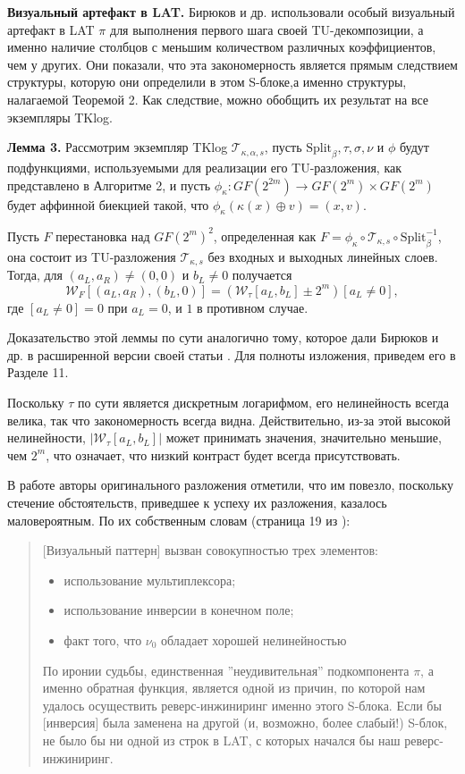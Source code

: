 \textbf{Визуальный артефакт в LAT.} Бирюков и др. использовали особый визуальный артефакт в LAT \(\pi\) для выполнения первого шага своей TU-декомпозиции, а именно наличие столбцов с меньшим количеством различных коэффициентов, чем у других. Они показали, что эта закономерность является прямым следствием структуры, которую они определили в этом S-блоке,а именно структуры, налагаемой Теоремой 2. Как следствие, можно обобщить их результат на все экземпляры TKlog.

\textbf{Лемма 3.}
Рассмотрим экземпляр TKlog \(\mathscr{T}_{\kappa,\alpha,s}\), пусть \(\text{Split}_{\beta}, \tau, \sigma, \nu\) и \(\phi\) будут подфункциями, используемыми для реализации его TU-разложения, как представлено в Алгоритме 2, и пусть \(\phi_{\kappa} : GF(2^{2m}) \to GF(2^m) \times GF(2^m)\) будет аффинной биекцией такой, что \(\phi_{\kappa}(\kappa(x) \oplus v) = (x, v)\).

Пусть \(F\) перестановка над \(GF (2^m)^2\), определенная как \(F = \phi_{\kappa} \circ \mathscr{T}_{\kappa,s} \circ \text{Split}^{-1}_{\beta}\), она состоит из TU-разложения \(\mathscr{T}_{\kappa,s}\) без входных и выходных линейных слоев. Тогда, для \((a_L, a_R) \neq (0, 0)\) и \(b_L \neq 0\) получается
\[
\mathcal{W}_{F}[(a_L, a_R), (b_L, 0)] = \left(\mathcal{W}_{\tau}[a_L, b_L] \pm 2^m\right)[a_L \neq 0],
\]
где \([a_L \neq 0] = 0\) при \(a_L = 0\), и \(1\) в противном случае.

Доказательство этой леммы по сути аналогично тому, которое дали Бирюков и др. в расширенной версии своей статьи \cite{BPU16b}. Для полноты изложения, приведем его в Разделе 11. 

Поскольку \(\tau\) по сути является дискретным логарифмом, его нелинейность всегда велика, так что закономерность всегда видна. Действительно, из-за этой высокой нелинейности, \(|\mathcal{W}_{\tau}[a_L, b_L]|\) может принимать значения, значительно меньшие, чем \(2^m\), что означает, что низкий контраст будет всегда присутствовать.

В работе \cite{BPU16a} авторы оригинального разложения отметили, что им повезло, поскольку стечение обстоятельств, приведшее к успеху их разложения, казалось маловероятным. По их собственным словам (страница 19 из \cite{BPU16b}):
\begin{quote}
[Визуальный паттерн] вызван совокупностью трех элементов:
\begin{itemize}
\item использование мультиплексора;
\item использование инверсии в конечном поле;
\item факт того, что \(\nu_0\) обладает хорошей нелинейностью
\end{itemize}
По иронии судьбы, единственная ''неудивительная'' подкомпонента \(\pi\), а именно обратная функция, является одной из причин, по которой нам удалось осуществить реверс-инжиниринг именно этого S-блока. Если бы [инверсия] была заменена на другой (и, возможно, более слабый!) S-блок, не было бы ни одной из строк в LAT, с которых начался бы наш реверс-инжиниринг.
\end{quote}

